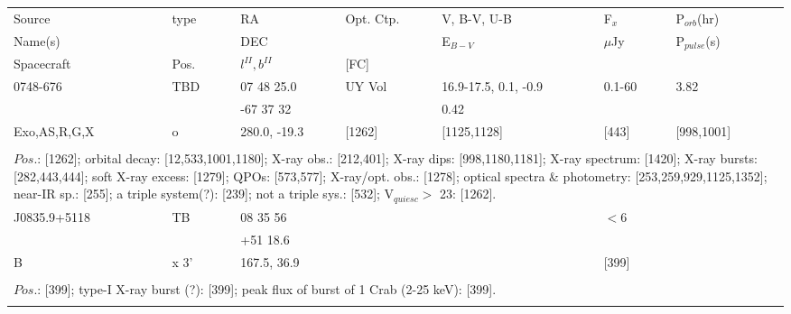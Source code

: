 \documentclass{aa}
\begin{document}

\begin{tabular}{p{2.5cm}p{1cm}p{1.8cm}p{2.3cm}p{3.3cm}p{2.0cm}p{2.2cm}}
\noalign{\smallskip}
\multicolumn{7}{p{17.5cm}}{Table 1.  (continued) }\\        
\hline
\noalign{\smallskip}
Source          & type  & RA                       &  Opt. Ctp. & V, B-V, U-B  & F$_{x}$          & P$_{orb}$(hr)    \\
 Name(s)       &            & DEC                    &                     & E$_{B-V}$   & $\mu$Jy        & P$_{pulse}$(s) \\
Spacecraft   & Pos.  & $l^{II}, b^{II}$      &  [FC]           &                       &                         &                             \\
\noalign{\smallskip} 
\hline

\noalign{\smallskip}
0748-676           & TBD          & 07 48 25.0       & UY Vol        & 16.9-17.5, 0.1, -0.9   & 0.1-60         & 3.82           \\
                            &                    & -67 37 32         &                      & 0.42                            &                     &                    \\
Exo,AS,R,G,X  & o                & 280.0, -19.3     & [1262]          & [1125,1128]              & [443]           & [998,1001]  \\
\\
\multicolumn{7}{p{17.5cm}}{
$Pos$.: [1262]; orbital decay: [12,533,1001,1180]; X-ray obs.: [212,401]; X-ray dips: [998,1180,1181]; X-ray spectrum: [1420]; 
X-ray bursts: [282,443,444]; soft X-ray excess: [1279]; QPOs: [573,577]; X-ray/opt. obs.: [1278]; optical spectra \& photometry: 
[253,259,929,1125,1352]; near-IR sp.: [255]; a triple system(?): [239]; not a triple sys.: [532]; V$_{quiesc}>$ 23: [1262].}\\
\noalign{\smallskip}
\hline

\noalign{\smallskip}
J0835.9+5118  &  TB         & 08 35 56        &           &      & $<6$            &       \\
                            &                & +51 18.6        &           &      &                      &       \\           
B                         &    x 3'      & 167.5, 36.9    &           &      & [399]           &      \\          
\\
\multicolumn{7}{p{17.5cm}}{
$Pos$.: [399]; type-I X-ray burst (?): [399]; peak flux of burst of 1 Crab (2-25 keV): [399].}\\
\noalign{\smallskip}
\hline


\end{tabular}
\end{document}
